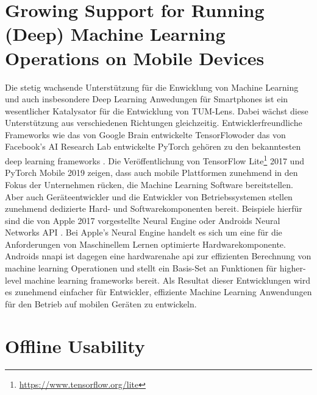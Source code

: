 \documentclass[
			   fontsize=11pt,
               paper=a4,
               bibliography=totoc,
               idxtotoc,
               headsepline,
               footsepline,
               footinclude=false,
               BCOR=12mm,
               DIV=13,
               openany,   %
               ]
               {scrbook}
\begin{document}
\section{Growing Support for Running (Deep) Machine Learning Operations on Mobile Devices}

Die stetig wachsende Unterstützung für die Enwicklung von Machine Learning und auch insbesondere Deep Learning Anwedungen für Smartphones ist ein wesentlicher Katalysator für die Entwicklung von TUM-Lens. Dabei wächst diese Unterstützung aus verschiedenen Richtungen gleichzeitig. Entwicklerfreundliche Frameworks wie das von Google Brain entwickelte TensorFlowoder das von Facebook's AI Research Lab entwickelte PyTorch gehören zu den bekanntesten deep learning frameworks \cite{dl_ranking_2018}. Die Veröffentlichung von TensorFlow Lite\footnote{\url{https://www.tensorflow.org/lite}} 2017 \cite{tflite_release_verge_2017} und PyTorch Mobile 2019 \cite{pytorch_release_2019} zeigen, dass auch mobile Plattformen zunehmend in den Fokus der Unternehmen rücken, die Machine Learning Software bereitstellen. Aber auch Geräteentwickler und die Entwickler von Betriebssystemen stellen zunehmend dedizierte Hard- und Softwarekomponenten bereit. Beispiele hierfür sind die von Apple 2017 vorgestellte Neural Engine \cite{neural_engine_verge_2017} oder Androids Neural Networks API \cite{nnapi_devguide_2021}. Bei Apple's Neural Engine handelt es sich um eine für die Anforderungen von Maschinellem Lernen optimierte Hardwarekomponente. Androids \acrfull{nnapi} ist dagegen eine hardwarenahe \Gls{api} zur effizienten Berechnung von machine learning Operationen und stellt ein Basis-Set an Funktionen für higher-level machine learning frameworks bereit. Als Resultat dieser Entwicklungen wird es zunehmend einfacher für Entwickler, effiziente Machine Learning Anwendungen für den Betrieb auf mobilen Geräten zu entwickeln.

\section{Offline Usability}
\end{document}
